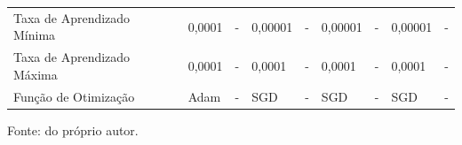 \begin{table}[H]
{\begin{tabular}{l|l|l|l|l|l|l|l|l}
        Taxa de Aprendizado Mínima                   & 0,0001                             & -                       & 0,00001                            & -                       & 0,00001                            & -                       & 0,00001                            & -                                                                  \\
        Taxa de Aprendizado Máxima                   & 0,0001                             & -                       & 0,0001                             & -                       & 0,0001                             & -                       & 0,0001                             & -                                                                  \\
        Função de Otimização                         & Adam                               & -                       & SGD                                & -                       & SGD                                & -                       & SGD                                & -                       
    \end{tabular}
    }

\vspace*{1 cm}
Fonte: do próprio autor.
\end{table}


